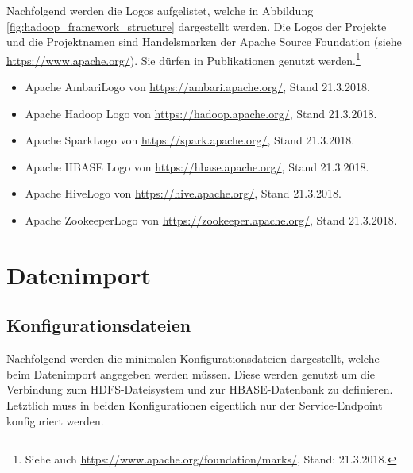 \noindent
Nachfolgend werden die Logos aufgelistet, welche in Abbildung \ref{fig:hadoop_framework_structure} dargestellt werden. Die Logos der Projekte und die Projektnamen sind Handelsmarken der Apache Source Foundation (siehe \url{https://www.apache.org/}). Sie dürfen in Publikationen genutzt werden.\footnote{Siehe auch \url{https://www.apache.org/foundation/marks/}, Stand: 21.3.2018.}

\begin{itemize}
\item Apache Ambari\texttrademark\thinspace Logo von \url{https://ambari.apache.org/}, Stand 21.3.2018. 
\item Apache Hadoop\textsuperscript{\textregistered} Logo von \url{https://hadoop.apache.org/}, Stand 21.3.2018.
\item Apache Spark\texttrademark\thinspace Logo von \url{https://spark.apache.org/}, Stand 21.3.2018.
\item Apache HBASE\textsuperscript{\textregistered} Logo von \url{https://hbase.apache.org/}, Stand 21.3.2018.
\item Apache Hive\texttrademark\thinspace Logo von \url{https://hive.apache.org/}, Stand 21.3.2018.
\item Apache Zookeeper\texttrademark\thinspace Logo von \url{https://zookeeper.apache.org/}, Stand 21.3.2018.
\end{itemize}


\chapter{Datenimport}
\section{Konfigurationsdateien}
\label{sec:appendix_data_import_config_management}
Nachfolgend werden die minimalen Konfigurationsdateien dargestellt, welche beim Datenimport angegeben werden müssen. Diese werden genutzt um die Verbindung zum HDFS-Dateisystem und zur HBASE-Datenbank zu definieren. Letztlich muss in beiden Konfigurationen eigentlich nur der Service-Endpoint konfiguriert werden.





%